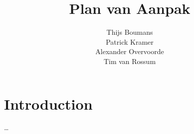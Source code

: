 \documentclass[11pt] {article}
\title{Plan van Aanpak}
\author{Thijs Boumans\\ Patrick Kramer\\ Alexander Overvoorde\\ Tim van Rossum}
\date{}
\begin{document}
\maketitle

\section{Introduction}
	\dots
\end{document}
